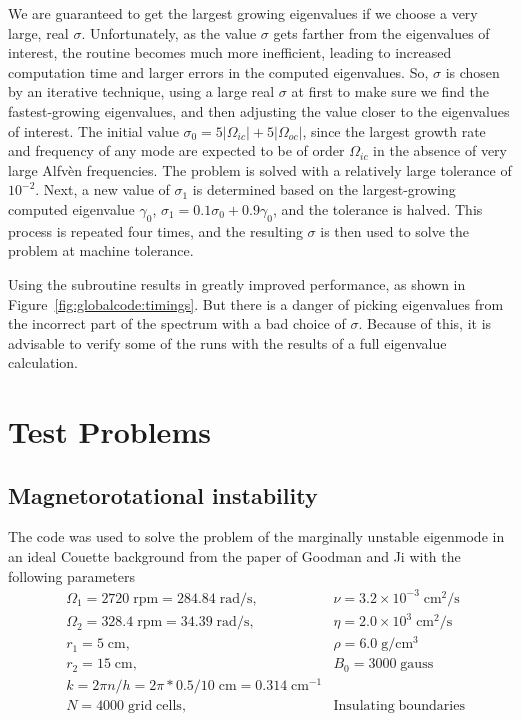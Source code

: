 \documentclass[letterpaper]{article}
\begin{document}
We are guaranteed to get the largest growing eigenvalues if we choose
a very large, real $\sigma$. Unfortunately, as the value $\sigma$ gets
farther from the eigenvalues of interest, the routine becomes much
more inefficient, leading to increased computation time and larger
errors in the computed eigenvalues. So, $\sigma$ is chosen by an
iterative technique, using a large real $\sigma$ at first to make sure
we find the fastest-growing eigenvalues, and then adjusting the value
closer to the eigenvalues of interest. The initial value $\sigma_0 =
5|\Omega_{ic}| + 5|\Omega_{oc}|$, since the largest growth rate and
frequency of any mode are expected to be of order $\Omega_{ic}$ in the
absence of very large Alfv\`{e}n frequencies. The problem is solved
with a relatively large tolerance of $10^{-2}$. Next, a new value of
$\sigma_1$ is determined based on the largest-growing computed
eigenvalue $\gamma_0$, $\sigma_1 = 0.1\sigma_0 + 0.9\gamma_0$, and the
tolerance is halved. This process is repeated four times, and the
resulting $\sigma$ is then used to solve the problem at machine
tolerance.

Using the \verb@ARPACK@ subroutine results in greatly improved
performance, as shown in Figure~\ref{fig:globalcode:timings}. But
there is a danger of picking eigenvalues from the incorrect part of
the spectrum with a bad choice of $\sigma$. Because of this, it is
advisable to verify some of the runs with the results of a full
eigenvalue calculation.

\section{Test Problems}

\subsection{Magnetorotational instability}

The code was used to solve the problem of the marginally unstable
eigenmode in an ideal Couette background from the paper of Goodman and
Ji with the following parameters
\begin{align*}
&\Omega_1 = 2720\;\mathrm{rpm} = 284.84\;\mathrm{rad/s},\quad
    &\nu = 3.2\times10^{-3}\;\mathrm{cm^2/s}
\\
&\Omega_2 = 328.4\;\mathrm{rpm} = 34.39\;\mathrm{rad/s},\quad
    &\eta = 2.0\times10^{3}\;\mathrm{cm^2/s}
\\
&r_1 = 5\;\mathrm{cm},\quad &\rho = 6.0\;\mathrm{g/cm^3}
\\
&r_2 = 15\;\mathrm{cm},\quad &B_0 = 3000\; \mathrm{gauss}
\\
&k = 2\pi n/h = 2\pi*0.5/10\;\mathrm{cm} = 0.314\;\mathrm{cm^{-1}}
\\
&N = 4000\;\mathrm{grid\;cells},\quad &\mathrm{Insulating\;boundaries}
\end{align*}
\end{document}
